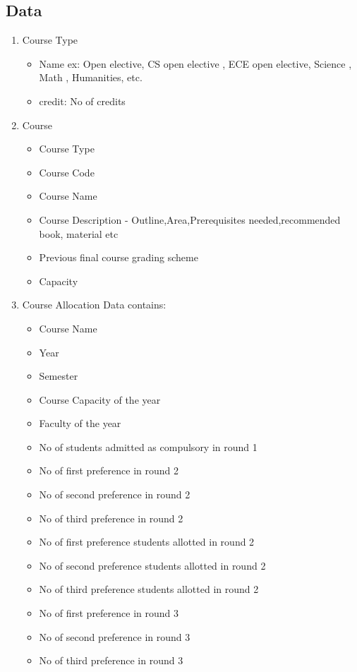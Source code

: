 \documentclass[conference]{IEEEtran}
\begin{document}
\subsection{Data}
\begin{enumerate}
\item Course Type 
    \begin{itemize}
    \item Name ex: Open elective, CS open elective , ECE open elective, Science , Math , Humanities, etc.
    \item credit: No of credits
    \end{itemize}
\item Course
    \begin{itemize}
    \item Course Type
    \item Course Code
    \item Course Name
    \item Course Description - Outline,Area,Prerequisites needed,recommended book, material etc
    \item Previous final course grading scheme
    \item Capacity
    \end{itemize}
\item Course Allocation Data contains:
    \begin{itemize}
    \item Course Name
    \item Year
    \item Semester
    \item Course Capacity of the year
    \item Faculty of the year
    \item No of students admitted as compulsory in round 1
    \item No of first preference in round 2
    \item No of second preference in round 2
    \item No of third preference in round 2
    \item No of first preference students allotted in round 2
    \item No of second preference students allotted in round 2
    \item No of third preference students allotted in round 2
    \item No of first preference in round 3
    \item No of second preference in round 3
    \item No of third preference in round 3

\end{itemize}
\end{enumerate}
\end{document}
